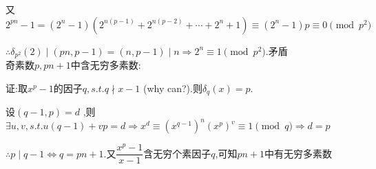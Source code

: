 又$ 2^{pn}-1=(2^n-1)(2^{n(p-1)}+2^{n(p-2)}+\cdots+2^n+1)\equiv(2^n-1)p\equiv 0\pmod{p^2}$

$ \therefore \delta_{p^2}(2)\mid (pn,p-1)=(n,p-1)\mid n\Rightarrow 2^n\equiv 1 \pmod {p^2}$.矛盾
\\

奇素数$ p,{pn+1}$中含无穷多素数:

证:取$ x^p-1$的因子$ q,s.t.q \nmid x-1$ (why can?).则$ \delta_q(x)=p$.

设$ (q-1,p)=d$ ,则$ \exists u,v,s.t.u(q-1)+vp=d\Rightarrow x^d\equiv(x^{q-1})^n(x^p)^v\equiv 1 \pmod q\Rightarrow d=p$ 

$ \therefore p\mid q-1\Leftrightarrow q=pn+1$.又$ \dfrac{x^p-1}{x-1}$含无穷个素因子$ q$,可知$ {pn+1}$中有无穷多素数
